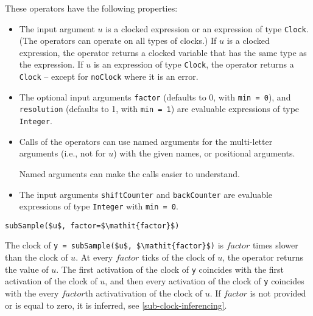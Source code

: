 These operators have the following properties:
\begin{itemize}
\item
  The input argument $u$ is a clocked expression or an expression of type \lstinline!Clock!.
  (The operators can operate on all types of clocks.)
  If $u$ is a clocked expression, the operator returns a clocked variable that has the same type as the expression.
  If $u$ is an expression of type \lstinline!Clock!, the operator returns a \lstinline!Clock! -- except for \lstinline!noClock! where it is an error.
\item
  The optional input arguments \lstinline!factor! (defaults to 0, with \lstinline!min = 0!), and \lstinline!resolution! (defaults to 1, with \lstinline!min = 1!) are evaluable expressions of type \lstinline!Integer!.
\item
  Calls of the operators can use named arguments for the multi-letter arguments (i.e., not for $u$) with the given names, or positional arguments.
\begin{nonnormative}
Named arguments can make the calls easier to understand.
\end{nonnormative}
\item
  The input arguments \lstinline!shiftCounter! and \lstinline!backCounter! are evaluable expressions of type \lstinline!Integer! with \lstinline!min = 0!.
\end{itemize}

\begin{operatordefinition}[subSample]
\begin{synopsis}\begin{lstlisting}
subSample($u$, factor=$\mathit{factor}$)
\end{lstlisting}\end{synopsis}
\begin{semantics}
The clock of \lstinline!y = subSample($u$, $\mathit{factor}$)! is $\mathit{factor}$ times slower than the clock of $u$.
At every $\mathit{factor}$ ticks of the clock of $u$, the operator returns the value of $u$.
The first activation of the clock of \lstinline!y! coincides with the first activation of the clock of $u$, and then every activation of the clock of \lstinline!y! coincides with the every $\mathit{factor}$th activativation of the clock of $u$.
If $\mathit{factor}$ is not provided or is equal to zero, it is inferred, see \cref{sub-clock-inferencing}.
\end{semantics}
\end{operatordefinition}

